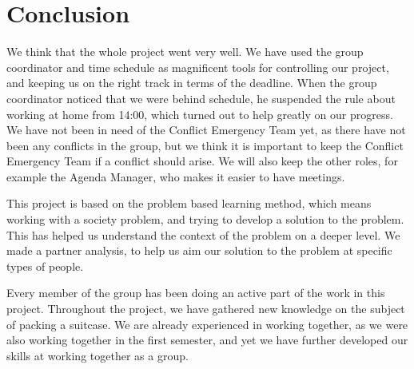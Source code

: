 \chapter{Conclusion}
We think that the whole project went very well. We have used the group coordinator and time schedule as magnificent tools for controlling our project, and keeping us on the right track in terms of the deadline. When the group coordinator noticed that we were behind schedule, he suspended the rule about working at home from 14:00, which turned out to help greatly on our progress. We have not been in need of the Conflict Emergency Team yet, as there have not been any conflicts in the group, but we think it is important to keep the Conflict Emergency Team if a conflict should arise. We will also keep the other roles, for example the Agenda Manager, who makes it easier to have meetings. 

This project is based on the problem based learning method, which means working with a society problem, and trying to develop a solution to the problem. This has helped us understand the context of the problem on a deeper level. We made a partner analysis, to help us aim our solution to the problem at specific types of people.

Every member of the group has been doing an active part of the work in this project. Throughout the project, we have gathered new knowledge on the subject of packing a suitcase. We are already experienced in working together, as we were also working together in the first semester, and yet we have further developed our skills at working together as a group. 